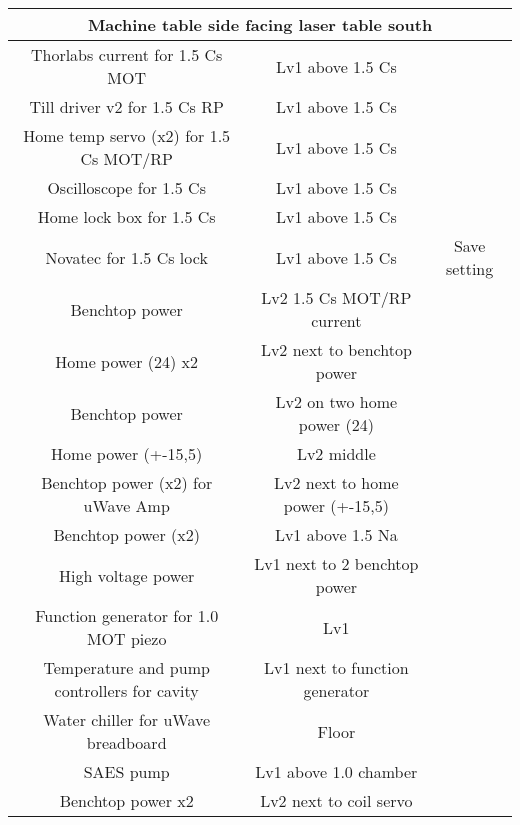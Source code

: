\documentclass[10pt,fleqn,twocolumn]{article}
\begin{document}
\begin{longtable}{|c|c|c|}
  \multicolumn{3}{|c|}{\textbf{Machine table side facing laser table} south}\\\hline
  Thorlabs current for 1.5 Cs MOT&Lv1 above 1.5 Cs&\\\hline
  Till driver v2 for 1.5 Cs RP&Lv1 above 1.5 Cs&\\\hline
  Home temp servo (x2) for 1.5 Cs MOT/RP&Lv1 above 1.5 Cs&\\\hline
  Oscilloscope for 1.5 Cs&Lv1 above 1.5 Cs&\\\hline
  Home lock box for 1.5 Cs&Lv1 above 1.5 Cs&\\\hline
  Novatec for 1.5 Cs lock&Lv1 above 1.5 Cs&Save setting\\\hline
  Benchtop power&Lv2 1.5 Cs MOT/RP current&\\\hline
  Home power (24) x2&Lv2 next to benchtop power&\\\hline
  Benchtop power&Lv2 on two home power (24)&\\\hline
  Home power (+-15,5)&Lv2 middle&\\\hline
  Benchtop power (x2) for uWave Amp&Lv2 next to home power (+-15,5)&\\\hline
  Benchtop power (x2)&Lv1 above 1.5 Na&\\\hline
  High voltage power&Lv1 next to 2 benchtop power&\\\hline
  Function generator for 1.0 MOT piezo&Lv1&\\\hline
  Temperature and pump controllers for cavity&Lv1 next to function generator&\\\hline
  Water chiller for uWave breadboard&Floor&\\\hline
  SAES pump&Lv1 above 1.0 chamber&\\\hline
  Benchtop power x2&Lv2 next to coil servo&\\\hline
\end{longtable}
\twocolumn
\end{document}

